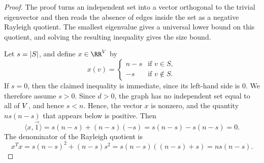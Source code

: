 \begin{proof}
	The proof turns an independent set into a vector orthogonal to the trivial eigenvector and then reads the absence of edges inside the set as a negative Rayleigh quotient. The smallest eigenvalue gives a universal lower bound on this quotient, and solving the resulting inequality gives the size bound.

	Let \(s=\lvert S\rvert\), and define \(x\in\RR^\Vertices\) by
	\begin{equation}
		x(v)=
		\begin{cases}
			n-s & \text{if }v\in S,    \\
			-s  & \text{if }v\notin S.
		\end{cases}
	\end{equation}
	If \(s=0\), then the claimed inequality is immediate, since its left-hand side is \(0\). We therefore assume \(s>0\). Since \(d>0\), the graph has no independent set equal to all of \(V\), and hence \(s<n\). Hence, the vector \(x\) is nonzero, and the quantity \(ns(n-s)\) that appears below is positive.
	Then
	\begin{equation}
		\langle x,\vec{1}\rangle=s(n-s)+(n-s)(-s)=s(n-s)-s(n-s)=0.
	\end{equation}
	The denominator of the Rayleigh quotient is
	\begin{equation}
		x^T x=s(n-s)^2+(n-s)s^2=s(n-s)\left((n-s)+s\right)=ns(n-s).
	\end{equation}


\end{proof}
